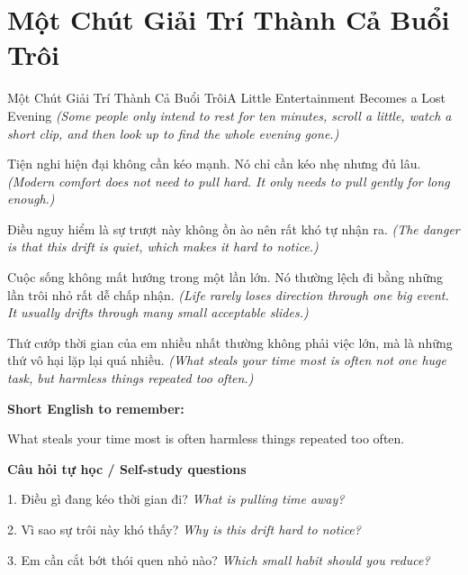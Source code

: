 \section{Một Chút Giải Trí Thành Cả Buổi Trôi}
\begin{truyen}{Một Chút Giải Trí Thành Cả Buổi Trôi}{A Little Entertainment Becomes a Lost Evening}
\textit{(Some people only intend to rest for ten minutes, scroll a little, watch a short clip, and then look up to find the whole evening gone.)}

Tiện nghi hiện đại không cần kéo mạnh. Nó chỉ cần kéo nhẹ nhưng đủ lâu.
\textit{(Modern comfort does not need to pull hard. It only needs to pull gently for long enough.)}

Điều nguy hiểm là sự trượt này không ồn ào nên rất khó tự nhận ra.
\textit{(The danger is that this drift is quiet, which makes it hard to notice.)}

Cuộc sống không mất hướng trong một lần lớn. Nó thường lệch đi bằng những lần trôi nhỏ rất dễ chấp nhận.
\textit{(Life rarely loses direction through one big event. It usually drifts through many small acceptable slides.)}

\end{truyen}

\begin{baihoc}
Thứ cướp thời gian của em nhiều nhất thường không phải việc lớn, mà là những thứ vô hại lặp lại quá nhiều.
\textit{(What steals your time most is often not one huge task, but harmless things repeated too often.)}
\end{baihoc}

\begin{ghinhoanh}
\textbf{Short English to remember:}

What steals your time most is often harmless things repeated too often.

\end{ghinhoanh}

\begin{tuhocnhanh}
\textbf{Câu hỏi tự học / Self-study questions}

1. Điều gì đang kéo thời gian đi? \textit{What is pulling time away?}

2. Vì sao sự trôi này khó thấy? \textit{Why is this drift hard to notice?}

3. Em cần cắt bớt thói quen nhỏ nào? \textit{Which small habit should you reduce?}
\end{tuhocnhanh}
\ngancach


